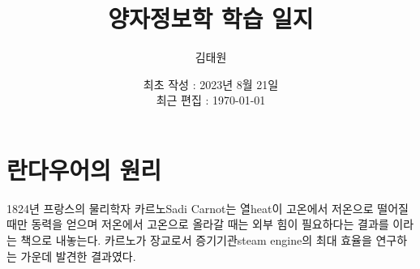 \documentclass[a4paper,chapter,atbegshi]{oblivoir}
\title{양자정보학 학습 일지}
\author{김태원}
\date{최초 작성 : 2023년 8월 21일 \\ 최근 편집 : \today}
\begin{document}
\maketitle

\chapter{란다우어의 원리}
1824년 프랑스의 물리학자 카르노{\tiny Sadi Carnot}는 열{\tiny heat}이 고온에서
저온으로 떨어질 때만 동력을 얻으며 저온에서 고온으로 올라갈 때는 외부 힘이
필요하다는 결과를 이라는 책으로 내놓는다. 카르노가 장교로서
증기기관{\tiny steam engine}의 최대 효율을 연구하는 가운데 발견한 결과였다.
\end{document}
